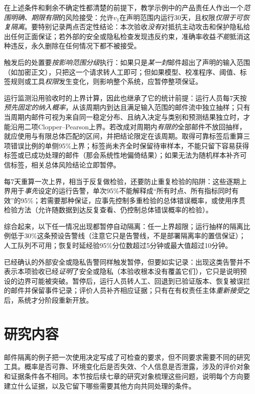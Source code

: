 在上述条件和剩余不确定性都清楚的前提下，教学示例中的产品责任人作出一个\emph{范围明确、期限有限}的风险接受：允许$v_1$在声明范围内运行30天，且权限\emph{仅限于可恢复隔离}。要特别记录两点否定性结论：本次验收\emph{没有}对抵抗主动攻击和保护隐私给出任何正面保证；若外部的安全或隐私检查发现违反约束，准确率收益\emph{不能}抵消这种违反，永久删除在任何情况下都不被接受。

触发后的处置要\emph{按影响范围分级}执行：如果只是\emph{某一封}邮件超出了声明的输入范围（如加密正文），只把这一个请求转人工即可；但如果模型、校准程序、阈值、标签规则或工具\emph{权限}发生变化，则影响整个系统，应暂停整项保证。

运行监测沿用验收时的上界计算，因此也继承了它的统计前提：运行人员每7天按\emph{预先固定的纳入概率}，从该周期内到达且满足输入范围的邮件流中独立抽样；只有当周期内邮件可视为来自同一稳定分布、且纳入决定与类别和预测结果独立时，才能沿用二项Clopper--Pearson上界。若改成对周期内\emph{有限的}全部邮件不放回抽样，就应使用与有限总体匹配的区间，并把结论限定在该周期。取得可靠标签后重算三项错误比例的单侧95\%上界；标签尚未齐全时保留待审样本，不能只留下容易获得标签或已成功处理的邮件（那会系统性地偏倚结果）；如果无法为随机样本补齐可信标签，相关总体风险结论立即暂停。

每7天重算一次上界，相当于反复做检验，还要防止重复检验的陷阱：这些逐期上界用于\emph{事先}设定的运行告警，单次95\%不能解释成“所有时点、所有指标同时有效”的95\%；若需要那种保证，应事先控制多重检验的总体错误概率，或使用序贯检验方法（允许随数据到达反复查看、仍控制总体错误概率的检验）。

综合起来，以下任一情况出现都暂停自动隔离：任一上界超限；运行抽样的隔离比例低于30\%这条预设告警线（注意它只是告警线，不是部署隔离率的置信保证）；人工队列不可用；恢复时延经验95\%分位数超过5分钟或最大值超过10分钟。

已经确认的外部安全或隐私告警同样触发暂停，但要如实记录：出现这类告警并不表示本项验收已经\emph{证明}了安全或隐私（本验收根本没有覆盖它们），它只是说明预设的边界可能被突破。暂停后，运行人员转人工、回退到已验证版本、恢复被误拦的邮件并保留事件记录；评价人员补齐相应证据；只有在有权责任主体\emph{重新接受}之后，系统才分阶段重新开放。

\section{研究内容}
\label{sec:trust-research-content}

邮件隔离的例子把一次使用决定写成了可检查的要求，但不同要求需要不同的研究工具。概率是否可靠、环境变化后是否失效、个人信息是否泄露，涉及的评价对象和证据条件各不相同。本节按后续七章的研究对象梳理这些问题，说明每个方向要建立什么证据，以及它留下哪些需要其他方向共同处理的条件。

